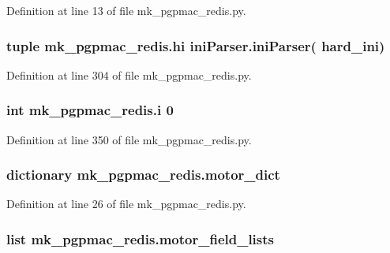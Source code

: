 Definition at line 13 of file mk\-\_\-pgpmac\-\_\-redis.\-py.

\hypertarget{namespacemk__pgpmac__redis_af0e472a4df25fc5c1660ef07226689a8}{
\subsubsection[{hi}]{\setlength{\rightskip}{0pt plus 5cm}tuple mk\-\_\-pgpmac\-\_\-redis.\-hi {\bf ini\-Parser.\-ini\-Parser}( {\bf hard\-\_\-ini})}}\label{namespacemk__pgpmac__redis_af0e472a4df25fc5c1660ef07226689a8}


Definition at line 304 of file mk\-\_\-pgpmac\-\_\-redis.\-py.

\hypertarget{namespacemk__pgpmac__redis_afa643a23a5984fe44c2182ada3dfa401}{
\subsubsection[{i}]{\setlength{\rightskip}{0pt plus 5cm}int mk\-\_\-pgpmac\-\_\-redis.\-i 0}}\label{namespacemk__pgpmac__redis_afa643a23a5984fe44c2182ada3dfa401}


Definition at line 350 of file mk\-\_\-pgpmac\-\_\-redis.\-py.

\hypertarget{namespacemk__pgpmac__redis_ad8583d4fe88c4c98af73d2858c51c660}{
\subsubsection[{motor\-\_\-dict}]{\setlength{\rightskip}{0pt plus 5cm}dictionary mk\-\_\-pgpmac\-\_\-redis.\-motor\-\_\-dict}}\label{namespacemk__pgpmac__redis_ad8583d4fe88c4c98af73d2858c51c660}


Definition at line 26 of file mk\-\_\-pgpmac\-\_\-redis.\-py.

\hypertarget{namespacemk__pgpmac__redis_a7228dc1b6ecec376538db1efe8c05ffb}{
\subsubsection[{motor\-\_\-field\-\_\-lists}]{\setlength{\rightskip}{0pt plus 5cm}list mk\-\_\-pgpmac\-\_\-redis.\-motor\-\_\-field\-\_\-lists}}\label{namespacemk__pgpmac__redis_a7228dc1b6ecec376538db1efe8c05ffb}



